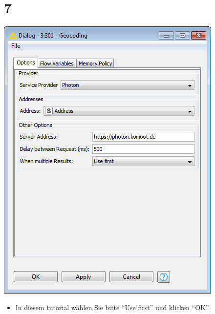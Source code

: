 \documentclass[10pt]{beamer}
\begin{document}
\section{7}
\begin{frame}
	\begin{center}
  		\includegraphics[height=0.5\textheight]{7.png}
	\end{center}
	\begin{itemize}
    \item In diesem tutorial wählen Sie bitte ``Use first'' und klicken ``OK''.
	\end{itemize}
\end{frame}
\end{document}
